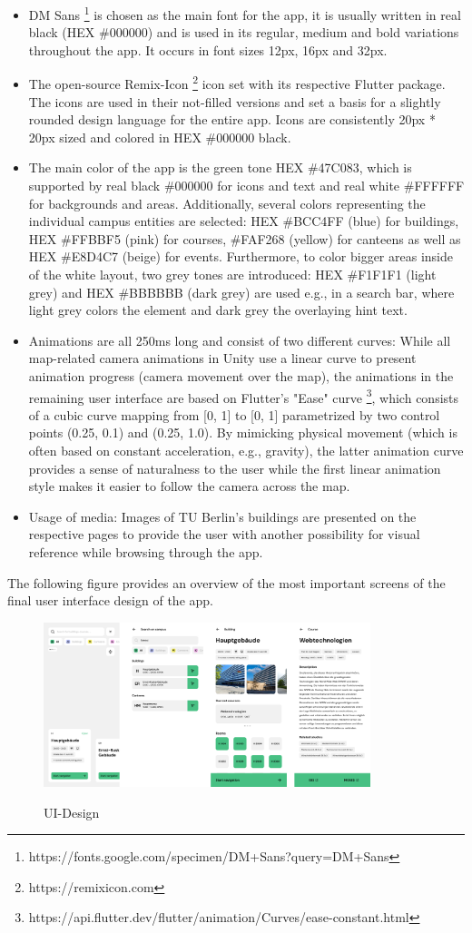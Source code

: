 \begin{itemize}
    \item DM Sans \footnote{https://fonts.google.com/specimen/DM+Sans?query=DM+Sans} is chosen as the main font for the app, it is usually written in real black (HEX \#000000) and is used in its regular, medium and bold variations throughout the app. It occurs in font sizes 12px, 16px and 32px.
    \item The open-source Remix-Icon \footnote{https://remixicon.com} icon set with its respective Flutter package. The icons are used in their not-filled versions and set a basis for a slightly rounded design language for the entire app. Icons are consistently 20px * 20px sized and colored in HEX \#000000 black.
    \item The main color of the app is the green tone HEX \#47C083, which is supported by real black \#000000 for icons and text and real white \#FFFFFF for backgrounds and areas. Additionally, several colors representing the individual campus entities are selected: HEX \#BCC4FF (blue) for buildings, HEX \#FFBBF5 (pink) for courses, \#FAF268 (yellow) for canteens as well as HEX \#E8D4C7 (beige) for events. Furthermore, to color bigger areas inside of the white layout, two grey tones are introduced: HEX \#F1F1F1 (light grey) and HEX \#BBBBBB (dark grey) are used e.g., in a search bar, where light grey colors the element and dark grey the overlaying hint text.
    \item Animations are all 250ms long and consist of two different curves: While all map-related camera animations in Unity use a linear curve to present animation progress (camera movement over the map), the animations in the remaining user interface are based on Flutter's "Ease" curve \footnote{https://api.flutter.dev/flutter/animation/Curves/ease-constant.html}, which consists of a cubic curve mapping from [0, 1] to [0, 1] parametrized by two control points (0.25, 0.1) and (0.25, 1.0). By mimicking physical movement (which is often based on constant acceleration, e.g., gravity), the latter animation curve provides a sense of naturalness to the user while the first linear animation style makes it easier to follow the camera across the map.
    \item Usage of media: Images of TU Berlin's buildings are presented on the respective pages to provide the user with another possibility for visual reference while browsing through the app.
\end{itemize}

The following figure provides an overview of the most important screens of the final user interface design of the app.

\begin{figure}[H]
	\centering
	\includegraphics[width=0.85\textwidth]{images/ui_design.png}\\
	\caption{UI-Design}
\end{figure}
